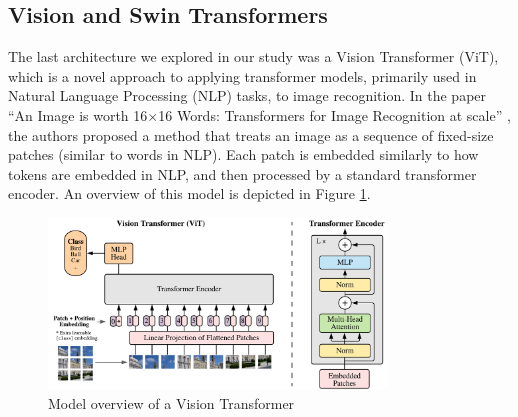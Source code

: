 \subsection{Vision and Swin Transformers}

The last architecture we explored in our study was a Vision Transformer (ViT), which is a novel approach to applying transformer models, primarily used in Natural Language Processing (NLP) tasks, to image recognition. In the paper ``An Image is worth 16$\times$16 Words: Transformers for Image Recognition at scale'' \cite{DBLP:journals/corr/abs-2010-11929}, the authors proposed a method that treats an image as a sequence of fixed-size patches (similar to words in NLP). Each patch is embedded similarly to how tokens are embedded in NLP, and then processed by a standard transformer encoder. An overview of this model is depicted in Figure \ref{fig:vit-arch}.

\begin{figure}
    \centering 
    \includegraphics[width=0.8\textwidth]{model_scheme.pdf}
    \caption{Model overview of a Vision Transformer \cite{DBLP:journals/corr/RonnebergerFB15}}
    \label{fig:vit-arch}
\end{figure}

